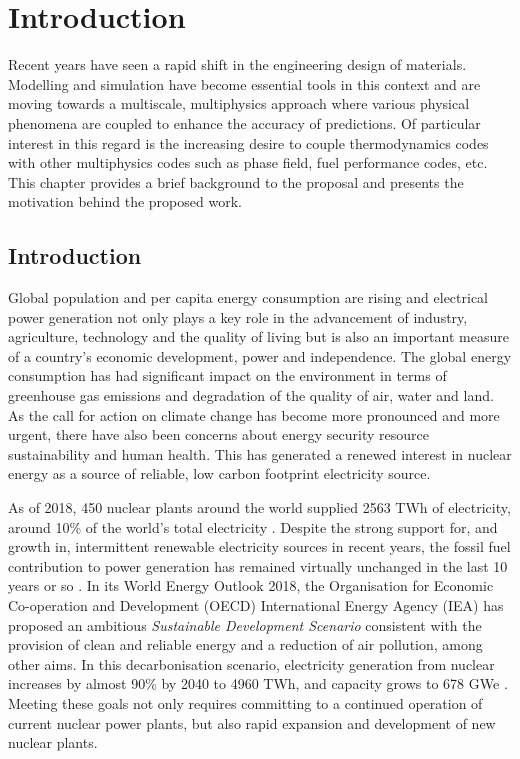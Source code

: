 \chapter{Introduction} \label{chap:introduction}

Recent years have seen a rapid shift in the engineering design of materials. Modelling and simulation have become essential tools in this context and are moving towards a multiscale, multiphysics approach where various physical phenomena  are coupled to enhance the accuracy of predictions. Of particular interest in this regard is the increasing desire to couple thermodynamics codes with other multiphysics codes such as phase field, fuel performance codes, etc. This chapter provides a brief background to the proposal and presents the motivation behind the proposed work.

\section{Introduction}
	Global population and per capita energy consumption are rising and electrical power generation not only plays a key role in the advancement of industry, agriculture, technology and the quality of living but is also an important measure of a country's economic development, power and independence. The global energy consumption has had significant impact on the environment in terms of greenhouse gas emissions and degradation of the quality of air, water and land.  As the call for action on climate change has become more pronounced and more urgent, there have also been concerns about energy security resource sustainability and human health. This has generated a renewed interest in nuclear energy as a source of reliable, low carbon footprint electricity source.

	As of 2018, 450 nuclear plants around the world supplied 2563 TWh of electricity, around 10\% of the world's total electricity \cite{WNA:2019aa}. Despite the strong support for, and growth in, intermittent renewable electricity sources in recent years, the fossil fuel contribution to power generation has remained virtually unchanged in the last 10 years or so \cite{WNA:2019aa}. In its World Energy Outlook 2018, the Organisation for Economic Co-operation and Development (OECD) International Energy Agency (IEA)  has proposed an ambitious \emph{Sustainable Development Scenario} consistent with the provision of clean and reliable energy and a reduction of air pollution, among other aims. In this decarbonisation scenario, electricity generation from nuclear increases by almost 90\% by 2040 to 4960 TWh, and capacity grows to 678 GWe \cite{IEA:2018aa}. Meeting these goals not only requires committing to a continued operation of current nuclear power plants, but also rapid expansion and development of new nuclear plants.


